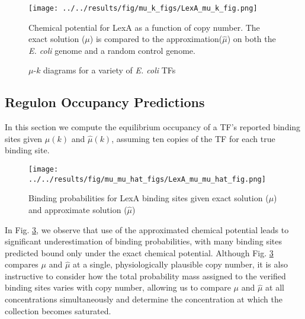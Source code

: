 \documentclass{article}
\begin{document}
\begin{figure}[ht]
  \centering
  \texttt{[image: ../../results/fig/mu\_k\_figs/LexA\_mu\_k\_fig.png]}
  \caption{Chemical potential for LexA as a function of copy number.
    The exact solution ($\mu$) is compared to the approximation($\hat\mu$) on both the
    \textit{E. coli} genome and a random control genome.}
  \label{fig:LexA_mu_vs_k}
\end{figure}



\begin{figure}[ht]
  \centering
  \caption{$\mu$-$k$ diagrams for a variety of \textit{E. coli} TFs}
  \label{fig:mu_vs_k_examples}
\end{figure}

\subsection{Regulon Occupancy Predictions}
In this section we compute the equilibrium occupancy of a TF's
reported binding sites given $\mu(k)$ and $\hat\mu(k)$, assuming ten
copies of the TF for each true binding site.

  \begin{figure}[ht]
    \centering
\texttt{[image: ../../results/fig/mu\_mu\_hat\_figs/LexA\_mu\_mu\_hat\_fig.png]}
    \caption{Binding probabilities for LexA binding sites given exact solution ($\mu$) and approximate solution ($\hat\mu$)}
    \label{fig:LexA_site_killing_exp}
  \end{figure}

  In Fig. \ref{fig:LexA_site_killing_exp}, we observe that use of the
  approximated chemical potential leads to significant underestimation
  of binding probabilities, with many binding sites predicted bound
  only under the exact chemical potential.  Although
  Fig. \ref{fig:LexA_site_killing_exp} compares $\mu$ and $\hat\mu$ at
  a single, physiologically plausible copy number, it is also
  instructive to consider how the total probability mass assigned to
  the verified binding sites varies with copy number, allowing us to
  compare $\mu$ and $\hat\mu$ at all concentrations simultaneously and
  determine the concentration at which the collection becomes saturated.
\end{document}
